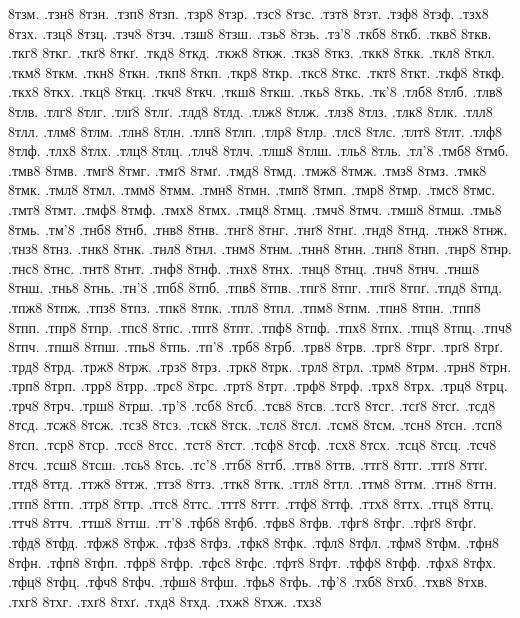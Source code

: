 {8тзм.
.тзн8
8тзн.
.тзп8
8тзп.
.тзр8
8тзр.
.тзс8
8тзс.
.тзт8
8тзт.
.тзф8
8тзф.
.тзх8
8тзх.
.тзц8
8тзц.
.тзч8
8тзч.
.тзш8
8тзш.
.тзь8
8тзь.
.тз'8
.ткб8
8ткб.
.ткв8
8ткв.
.ткг8
8ткг.
.ткґ8
8ткґ.
.ткд8
8ткд.
.ткж8
8ткж.
.ткз8
8ткз.
.ткк8
8ткк.
.ткл8
8ткл.
.ткм8
8ткм.
.ткн8
8ткн.
.ткп8
8ткп.
.ткр8
8ткр.
.ткс8
8ткс.
.ткт8
8ткт.
.ткф8
8ткф.
.ткх8
8ткх.
.ткц8
8ткц.
.ткч8
8ткч.
.ткш8
8ткш.
.ткь8
8ткь.
.тк'8
.тлб8
8тлб.
.тлв8
8тлв.
.тлг8
8тлг.
.тлґ8
8тлґ.
.тлд8
8тлд.
.тлж8
8тлж.
.тлз8
8тлз.
.тлк8
8тлк.
.тлл8
8тлл.
.тлм8
8тлм.
.тлн8
8тлн.
.тлп8
8тлп.
.тлр8
8тлр.
.тлс8
8тлс.
.тлт8
8тлт.
.тлф8
8тлф.
.тлх8
8тлх.
.тлц8
8тлц.
.тлч8
8тлч.
.тлш8
8тлш.
.тль8
8тль.
.тл'8
.тмб8
8тмб.
.тмв8
8тмв.
.тмг8
8тмг.
.тмґ8
8тмґ.
.тмд8
8тмд.
.тмж8
8тмж.
.тмз8
8тмз.
.тмк8
8тмк.
.тмл8
8тмл.
.тмм8
8тмм.
.тмн8
8тмн.
.тмп8
8тмп.
.тмр8
8тмр.
.тмс8
8тмс.
.тмт8
8тмт.
.тмф8
8тмф.
.тмх8
8тмх.
.тмц8
8тмц.
.тмч8
8тмч.
.тмш8
8тмш.
.тмь8
8тмь.
.тм'8
.тнб8
8тнб.
.тнв8
8тнв.
.тнг8
8тнг.
.тнґ8
8тнґ.
.тнд8
8тнд.
.тнж8
8тнж.
.тнз8
8тнз.
.тнк8
8тнк.
.тнл8
8тнл.
.тнм8
8тнм.
.тнн8
8тнн.
.тнп8
8тнп.
.тнр8
8тнр.
.тнс8
8тнс.
.тнт8
8тнт.
.тнф8
8тнф.
.тнх8
8тнх.
.тнц8
8тнц.
.тнч8
8тнч.
.тнш8
8тнш.
.тнь8
8тнь.
.тн'8
.тпб8
8тпб.
.тпв8
8тпв.
.тпг8
8тпг.
.тпґ8
8тпґ.
.тпд8
8тпд.
.тпж8
8тпж.
.тпз8
8тпз.
.тпк8
8тпк.
.тпл8
8тпл.
.тпм8
8тпм.
.тпн8
8тпн.
.тпп8
8тпп.
.тпр8
8тпр.
.тпс8
8тпс.
.тпт8
8тпт.
.тпф8
8тпф.
.тпх8
8тпх.
.тпц8
8тпц.
.тпч8
8тпч.
.тпш8
8тпш.
.тпь8
8тпь.
.тп'8
.трб8
8трб.
.трв8
8трв.
.трг8
8трг.
.трґ8
8трґ.
.трд8
8трд.
.трж8
8трж.
.трз8
8трз.
.трк8
8трк.
.трл8
8трл.
.трм8
8трм.
.трн8
8трн.
.трп8
8трп.
.трр8
8трр.
.трс8
8трс.
.трт8
8трт.
.трф8
8трф.
.трх8
8трх.
.трц8
8трц.
.трч8
8трч.
.трш8
8трш.
.тр'8
.тсб8
8тсб.
.тсв8
8тсв.
.тсг8
8тсг.
.тсґ8
8тсґ.
.тсд8
8тсд.
.тсж8
8тсж.
.тсз8
8тсз.
.тск8
8тск.
.тсл8
8тсл.
.тсм8
8тсм.
.тсн8
8тсн.
.тсп8
8тсп.
.тср8
8тср.
.тсс8
8тсс.
.тст8
8тст.
.тсф8
8тсф.
.тсх8
8тсх.
.тсц8
8тсц.
.тсч8
8тсч.
.тсш8
8тсш.
.тсь8
8тсь.
.тс'8
.ттб8
8ттб.
.ттв8
8ттв.
.ттг8
8ттг.
.ттґ8
8ттґ.
.ттд8
8ттд.
.ттж8
8ттж.
.ттз8
8ттз.
.ттк8
8ттк.
.ттл8
8ттл.
.ттм8
8ттм.
.ттн8
8ттн.
.ттп8
8ттп.
.ттр8
8ттр.
.ттс8
8ттс.
.ттт8
8ттт.
.ттф8
8ттф.
.ттх8
8ттх.
.ттц8
8ттц.
.ттч8
8ттч.
.ттш8
8ттш.
.тт'8
.тфб8
8тфб.
.тфв8
8тфв.
.тфг8
8тфг.
.тфґ8
8тфґ.
.тфд8
8тфд.
.тфж8
8тфж.
.тфз8
8тфз.
.тфк8
8тфк.
.тфл8
8тфл.
.тфм8
8тфм.
.тфн8
8тфн.
.тфп8
8тфп.
.тфр8
8тфр.
.тфс8
8тфс.
.тфт8
8тфт.
.тфф8
8тфф.
.тфх8
8тфх.
.тфц8
8тфц.
.тфч8
8тфч.
.тфш8
8тфш.
.тфь8
8тфь.
.тф'8
.тхб8
8тхб.
.тхв8
8тхв.
.тхг8
8тхг.
.тхґ8
8тхґ.
.тхд8
8тхд.
.тхж8
8тхж.
.тхз8
}
